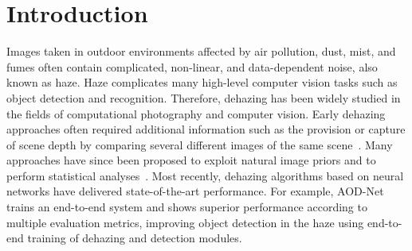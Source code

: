 \documentclass[10pt,twocolumn,letterpaper]{article}
\begin{document}
\section{Introduction}
\label{Intro}
Images taken in outdoor environments affected by air pollution, dust, mist, and fumes often contain complicated, non-linear, and data-dependent noise, also known as haze. Haze complicates many high-level computer vision tasks such as object detection and recognition. 
Therefore, dehazing has been widely studied in the fields of computational photography and computer vision. Early dehazing approaches often required additional information such as the provision or capture of scene depth by comparing several different images of the same scene~\cite{tan2000enhancement,schechner2001instant,kopf2008deep}. Many approaches have since been proposed to exploit natural image priors and to perform statistical analyses~\cite{he2011single,tang2014investigating,zhu2015fast,berman2016non}. Most recently, dehazing algorithms based on neural networks \cite{cai2016dehazenet,ren2016single,li2017aod} have delivered state-of-the-art performance. For example, AOD-Net \cite{li2017aod} trains an end-to-end system and shows superior performance according to multiple evaluation metrics, improving object detection in the haze using end-to-end training of dehazing and detection modules.
\end{document}
